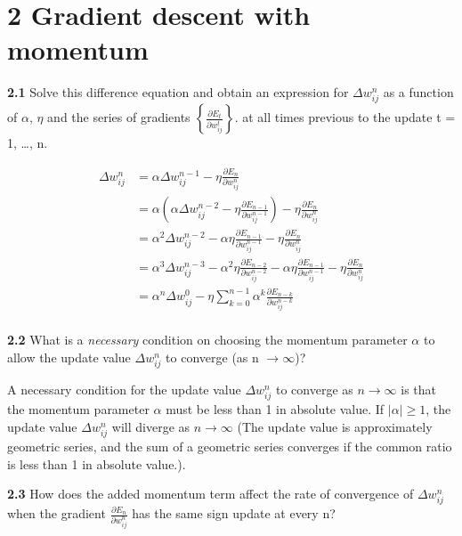 \documentclass[a4paper, 12pt]{article}
\begin{document}
\section*{2 Gradient descent with momentum}

\textcolor{myblue}{
\textbf{2.1} {Solve this difference equation and obtain an expression for $\Delta w_{ij}^{n}$ 
as a function of $\alpha$, $\eta$ and the series of gradients
 $\left\{ \frac{\partial E_{t}}{\partial w_{ij}^{t}} \right\} $.
at all times previous to the update t = 1, \dots,  n.
    }
}

\begin{align*}
    \Delta w_{ij}^{n} &= \alpha \Delta w_{ij}^{n-1} - \eta \frac{\partial E_{n}}{\partial w_{ij}^{n}} \\
    &= \alpha \left( \alpha \Delta w_{ij}^{n-2} - \eta \frac{\partial E_{n-1}}{\partial w_{ij}^{n-1}} \right) - \eta \frac{\partial E_{n}}{\partial w_{ij}^{n}} \\
    &= \alpha^2 \Delta w_{ij}^{n-2} - \alpha \eta \frac{\partial E_{n-1}}{\partial w_{ij}^{n-1}} - \eta \frac{\partial E_{n}}{\partial w_{ij}^{n}} \\
    &= \alpha^3 \Delta w_{ij}^{n-3} - \alpha^2 \eta \frac{\partial E_{n-2}}{\partial w_{ij}^{n-2}} - \alpha \eta \frac{\partial E_{n-1}}{\partial w_{ij}^{n-1}} - \eta \frac{\partial E_{n}}{\partial w_{ij}^{n}} \\
    &= \alpha^n \Delta w_{ij}^{0} - \eta \sum_{k=0}^{n-1} \alpha^{k} \frac{\partial E_{n-k}}{\partial w_{ij}^{n-k}} \\
\end{align*}



\textcolor{myblue}{
\textbf{2.2} {
    What is a \textit{necessary} condition on choosing the momentum parameter $\alpha$ to allow the update 
    value $\Delta w_{ij}^{n}$ to converge (as n $\rightarrow \infty$)?
    }  
}

A necessary condition for the update value $\Delta w_{ij}^{n}$ to converge as $n \rightarrow \infty$ is that the momentum parameter $\alpha$ must be less than 1 in absolute value.
If $\lvert \alpha \rvert \geq 1$, the update value $\Delta w_{ij}^{n}$ will diverge as $n \rightarrow \infty$
(The update value is approximately geometric series, 
and the sum of a geometric series converges if the common ratio is less than 1 in absolute value.).


\bigskip
\textcolor{myblue}{
\textbf{2.3} {
    How does the added momentum term affect the rate of convergence of $\Delta w_{ij}^{n}$ when the gradient
    $\frac{\partial E_{n}}{\partial w_{ij}^{n}}$ has the same sign update at every n?
    }  
}
\end{document}
